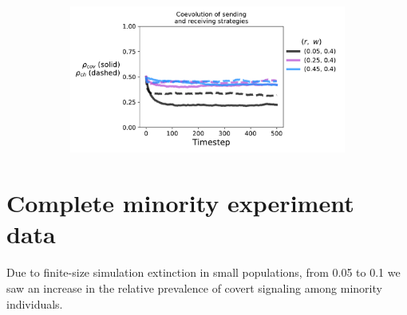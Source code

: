 \documentclass[11pt,letterpaper]{article}
\begin{document}
\begin{appendices}
\begin{figure}[H]
\begin{subfigure}{0.49\textwidth}
  \caption{}
  \end{subfigure}
  \begin{subfigure}{0.49\textwidth}
    \includegraphics[width=\textwidth]{Figures/receptivity_evo_w=0p4.pdf}
  \caption{}
  \end{subfigure}
  \caption{}
  \label{fig:}
\end{figure}

\section{Complete minority experiment data}

Due to finite-size simulation extinction in small populations, from 0.05 to
0.1 we saw an increase in the relative prevalence of covert signaling among
minority individuals. 



\end{appendices}
\end{document}
